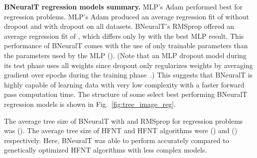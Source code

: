 \documentclass[11pt,a4paper]{article}
\begin{document}
    \textbf{BNeuralT regression models summary.}  
    MLP's Adam performed best for regression problems. MLP's Adam produced an average regression fit of  without dropout and  with dropout on all datasets. BNeuralT's RMSprop offered an average regression fit of , which differs only by  with the best MLP result. This performance of  BNeuralT comes with the use of only  trainable parameters than the parameters used by the MLP (). (Note that an MLP dropout model during its test phase uses all weights since dropout only regularizes weights by averaging gradient over epochs during the training phase~\citep{srivastava14aJMLR}.) This suggests that BNeuralT is highly capable of learning data with very low complexity with a faster forward pass computation time. The structure of some select best performing BNeuralT regression models is shown in Fig.~\ref{fig:tree_image_reg}.


    The average tree size of BNeuralT with  and RMSprop for regression problems was  (). The average tree size of HFNT and HFNT algorithms were  () and  () respectively. Here, BNeuralT was able to perform accurately compared to genetically optimized HFNT algorithms with less complex models.
    
\end{document}
